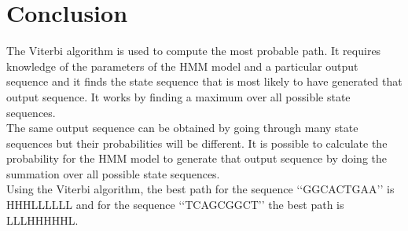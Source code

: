 \documentclass[12pt]{article}
\begin{document}
\section{Conclusion}
The Viterbi algorithm is used to compute the most probable path. It requires knowledge of the parameters of the HMM model and a particular output sequence and it finds the state sequence that is most likely to have generated that output sequence. It works by finding a maximum over all possible state sequences. \\

The same output sequence can be obtained by going through many state sequences but their probabilities will be different. It is possible to calculate the probability for the HMM model to generate that output sequence by doing the summation over all possible state sequences. \\

Using the Viterbi algorithm, the best path for the sequence \lq\lq{GGCACTGAA}\rq\rq{} is HHHLLLLLL and for the sequence \lq\lq{TCAGCGGCT}\rq\rq{} the best path is LLLHHHHHL.
\end{document}
